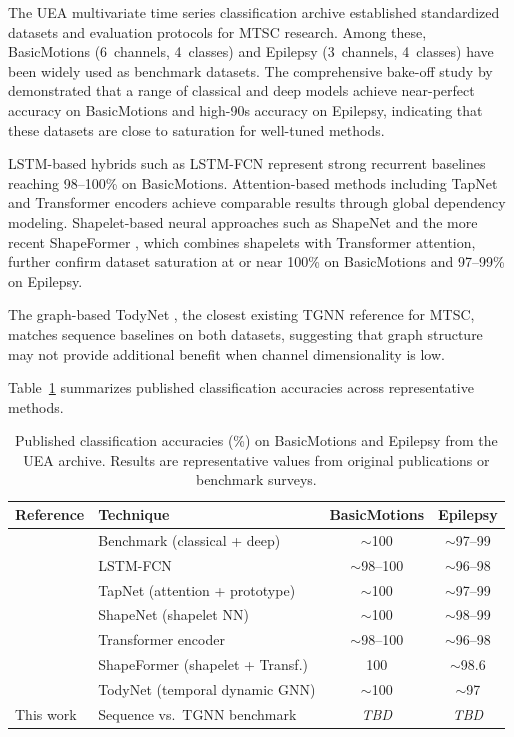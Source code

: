 \documentclass[11pt,a4paper]{article}
\begin{document}
The UEA multivariate time series classification archive \citep{bagnall2018uea} established standardized datasets and evaluation protocols for MTSC research. Among these, BasicMotions (6~channels, 4~classes) and Epilepsy (3~channels, 4~classes) have been widely used as benchmark datasets. The comprehensive bake-off study by \citet{ruiz2021bakeoff} demonstrated that a range of classical and deep models achieve near-perfect accuracy on BasicMotions and high-90s accuracy on Epilepsy, indicating that these datasets are close to saturation for well-tuned methods.

LSTM-based hybrids such as LSTM-FCN \citep{karim2019lstmfcn} represent strong recurrent baselines reaching 98--100\% on BasicMotions. Attention-based methods including TapNet \citep{zhang2020tapnet} and Transformer encoders \citep{zerveas2021transformer} achieve comparable results through global dependency modeling. Shapelet-based neural approaches such as ShapeNet \citep{li2021shapenet} and the more recent ShapeFormer \citep{le2024shapeformer}, which combines shapelets with Transformer attention, further confirm dataset saturation at or near 100\% on BasicMotions and 97--99\% on Epilepsy.

The graph-based TodyNet \citep{liu2024todynet}, the closest existing TGNN reference for MTSC, matches sequence baselines on both datasets, suggesting that graph structure may not provide additional benefit when channel dimensionality is low.

Table~\ref{tab:lit_uea} summarizes published classification accuracies across representative methods.

\begin{table}[htbp]
\centering
\caption{Published classification accuracies (\%) on BasicMotions and Epilepsy from the UEA archive. Results are representative values from original publications or benchmark surveys.}
\label{tab:lit_uea}
\small
\begin{tabular}{@{}llcc@{}}
\toprule
\textbf{Reference} & \textbf{Technique} & \textbf{BasicMotions} & \textbf{Epilepsy} \\
\midrule
\citet{ruiz2021bakeoff} & Benchmark (classical + deep) & $\sim$100 & $\sim$97--99 \\
\citet{karim2019lstmfcn} & LSTM-FCN & $\sim$98--100 & $\sim$96--98 \\
\citet{zhang2020tapnet} & TapNet (attention + prototype) & $\sim$100 & $\sim$97--99 \\
\citet{li2021shapenet} & ShapeNet (shapelet NN) & $\sim$100 & $\sim$98--99 \\
\citet{zerveas2021transformer} & Transformer encoder & $\sim$98--100 & $\sim$96--98 \\
\citet{le2024shapeformer} & ShapeFormer (shapelet + Transf.) & 100 & $\sim$98.6 \\
\citet{liu2024todynet} & TodyNet (temporal dynamic GNN) & $\sim$100 & $\sim$97 \\
\midrule
This work & Sequence vs.\ TGNN benchmark & \textit{TBD} & \textit{TBD} \\
\bottomrule
\end{tabular}
\end{table}
\end{document}
